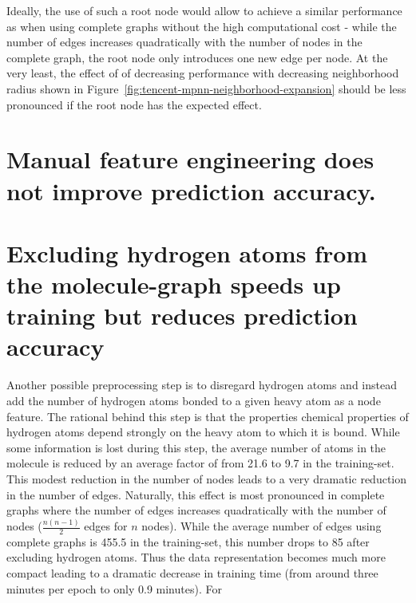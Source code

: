 Ideally, the use of such a root node would allow to achieve a similar performance as when using complete graphs without the high computational cost - while the number of edges increases quadratically with the number of nodes in the complete graph, the root node only introduces one new edge per node. At the very least, the effect of of decreasing performance with decreasing neighborhood radius shown in Figure~\ref{fig:tencent-mpnn-neighborhood-expansion} should be less pronounced if the root node has the expected effect.






\section{Manual feature engineering does not improve prediction accuracy.}


\section{Excluding hydrogen atoms from the molecule-graph speeds up training but reduces prediction accuracy}

Another possible preprocessing step is to disregard hydrogen atoms and instead add the number of hydrogen atoms bonded to a given heavy atom as a node feature. The rational behind this step is that the properties chemical properties of hydrogen atoms depend strongly on the heavy atom to which it is bound. While some information is lost during this step, the average number of atoms in the molecule is reduced by an average factor of
%
from 21.6 to 9.7 in the training-set. This modest reduction in the number of nodes leads to a very dramatic reduction in the number of edges. Naturally, this effect is most pronounced in complete graphs where the number of edges increases quadratically with the number of nodes ($\frac{n(n - 1)}{2}$ edges for $n$ nodes). While the average number of edges using complete graphs is 455.5 in the training-set, this number drops to 85 after excluding hydrogen atoms. Thus the data representation becomes much more compact leading to a dramatic decrease in training time (from around three minutes per epoch to only 0.9 minutes). For 

